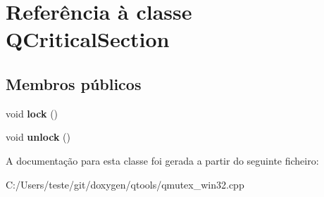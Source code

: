 \hypertarget{class_q_critical_section}{\section{Referência à classe Q\-Critical\-Section}
\label{class_q_critical_section}
}
\subsection*{Membros públicos}
\begin{DoxyCompactItemize}
\item 
\hypertarget{class_q_critical_section_aa81aed607133209dade63a226818224d}{void {\bfseries lock} ()}\label{class_q_critical_section_aa81aed607133209dade63a226818224d}

\item 
\hypertarget{class_q_critical_section_a9278be8203e1c42e2619179882ae4403}{void {\bfseries unlock} ()}\label{class_q_critical_section_a9278be8203e1c42e2619179882ae4403}

\end{DoxyCompactItemize}


A documentação para esta classe foi gerada a partir do seguinte ficheiro\-:\begin{DoxyCompactItemize}
\item 
C\-:/\-Users/teste/git/doxygen/qtools/qmutex\-\_\-win32.\-cpp\end{DoxyCompactItemize}

